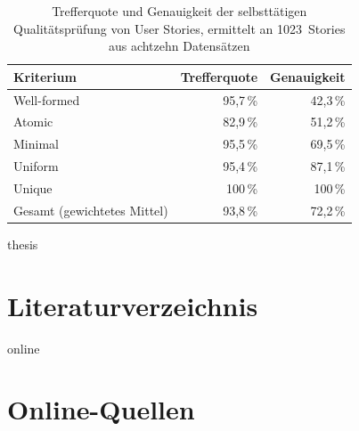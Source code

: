 \documentclass[11pt,a4paper]{report}
\begin{document}
\begin{table}[htbp]
  \centering
  \caption{Trefferquote und Genauigkeit der selbsttätigen
           Qualitätsprüfung von User Stories, ermittelt an
           1023~Stories aus achtzehn Datensätzen
           \cite[Tab.~4 und 5]{lucassen2016qus}}
  \label{tab:aqusa}
  \begin{tabular}{@{}>{\raggedright\arraybackslash}p{4.5cm}rr@{}}
    \toprule
    \textbf{Kriterium} & \textbf{Trefferquote} & \textbf{Genauigkeit} \\
    \midrule
    Well-formed & 95,7\,\% & 42,3\,\% \\
    Atomic      & 82,9\,\% & 51,2\,\% \\
    Minimal     & 95,5\,\% & 69,5\,\% \\
    Uniform     & 95,4\,\% & 87,1\,\% \\
    Unique      & 100\,\%  & 100\,\% \\
    \midrule
    Gesamt (gewichtetes Mittel) & 93,8\,\% & 72,2\,\% \\
    \bottomrule
  \end{tabular}
\end{table}


\begin{btSect}{thesis}
\section*{Literaturverzeichnis}
\btPrintCited
\end{btSect}
\begin{btSect}{online}
\section*{Online-Quellen}
\btPrintCited
\end{btSect}
\end{document}
